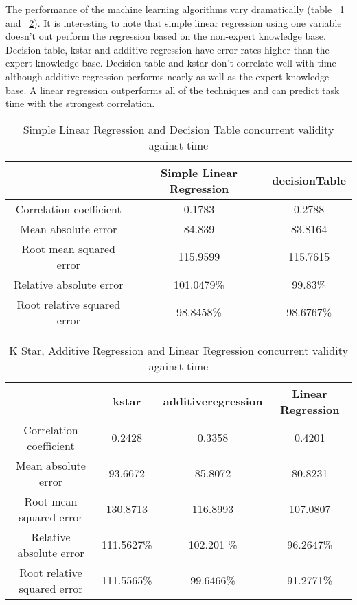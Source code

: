 The performance of the machine learning algorithms vary dramatically (table ~\ref{tab:ml1currenttime} and ~\ref{tab:ml2currenttime}). It is interesting to note that simple linear regression using one variable doesn't out perform the regression based on the non-expert knowledge base. Decision table, kstar and additive regression have error rates higher than the expert knowledge base. Decision table and kstar don't correlate well with time although additive regression performs nearly as well as the expert knowledge base. A linear regression outperforms all of the techniques and can predict task time with the strongest correlation.

\begin{table}[!htbp]
\centering
\begin{tabular}{|c|c|c|}
\hline
                            & Simple Linear Regression   & decisionTable\\ \hline
Correlation coefficient     & 0.1783        & 0.2788    \\
Mean absolute error         & 84.839        & 83.8164   \\
Root mean squared error     & 115.9599      & 115.7615  \\
Relative absolute error     & 101.0479\%    & 99.83\%   \\
Root relative squared error & 98.8458\%     & 98.6767\% \\
\hline
\end{tabular}
\caption{Simple Linear Regression and Decision Table concurrent validity against time}
\label{tab:ml1currenttime}
\end{table}

\begin{table}[!htbp]
\centering
\begin{tabular}{|c|c|c|c|}
\hline
                            & kstar & additiveregression & Linear Regression\\ \hline
Correlation coefficient     &  0.2428       & 0.3358    & 0.4201 \\
Mean absolute error         &  93.6672      & 85.8072   & 80.8231 \\
Root mean squared error     &  130.8713     & 116.8993  & 107.0807  \\
Relative absolute error     & 111.5627\%   & 102.201 \% & 96.2647\%\\
Root relative squared error &  111.5565\%   & 99.6466\%  & 91.2771\%\\
\hline
\end{tabular}
\caption{K Star, Additive Regression and Linear Regression concurrent validity against time}
\label{tab:ml2currenttime}
\end{table}

